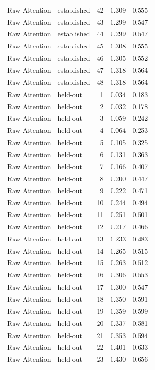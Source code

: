 \begin{tabular}{llrrr}
Raw Attention & established & 42 & 0.309 & 0.555 \\
Raw Attention & established & 43 & 0.299 & 0.547 \\
Raw Attention & established & 44 & 0.299 & 0.547 \\
Raw Attention & established & 45 & 0.308 & 0.555 \\
Raw Attention & established & 46 & 0.305 & 0.552 \\
Raw Attention & established & 47 & 0.318 & 0.564 \\
Raw Attention & established & 48 & 0.318 & 0.564 \\
Raw Attention & held-out & 1 & 0.034 & 0.183 \\
Raw Attention & held-out & 2 & 0.032 & 0.178 \\
Raw Attention & held-out & 3 & 0.059 & 0.242 \\
Raw Attention & held-out & 4 & 0.064 & 0.253 \\
Raw Attention & held-out & 5 & 0.105 & 0.325 \\
Raw Attention & held-out & 6 & 0.131 & 0.363 \\
Raw Attention & held-out & 7 & 0.166 & 0.407 \\
Raw Attention & held-out & 8 & 0.200 & 0.447 \\
Raw Attention & held-out & 9 & 0.222 & 0.471 \\
Raw Attention & held-out & 10 & 0.244 & 0.494 \\
Raw Attention & held-out & 11 & 0.251 & 0.501 \\
Raw Attention & held-out & 12 & 0.217 & 0.466 \\
Raw Attention & held-out & 13 & 0.233 & 0.483 \\
Raw Attention & held-out & 14 & 0.265 & 0.515 \\
Raw Attention & held-out & 15 & 0.263 & 0.512 \\
Raw Attention & held-out & 16 & 0.306 & 0.553 \\
Raw Attention & held-out & 17 & 0.300 & 0.547 \\
Raw Attention & held-out & 18 & 0.350 & 0.591 \\
Raw Attention & held-out & 19 & 0.359 & 0.599 \\
Raw Attention & held-out & 20 & 0.337 & 0.581 \\
Raw Attention & held-out & 21 & 0.353 & 0.594 \\
Raw Attention & held-out & 22 & 0.401 & 0.633 \\
Raw Attention & held-out & 23 & 0.430 & 0.656 \\

\end{tabular}
